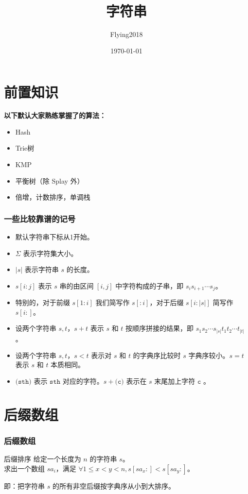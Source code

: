 \documentclass[UTF8]{beamer}
\begin{document}
\begin{CJK}{UTF8}{song}
\title[字符串]{字符串}

\author{Flying2018}
\date{\today}

\begin{frame}
	\titlepage
\end{frame}
\section{前置知识}
\begin{frame}
	\par
	\textbf{以下默认大家熟练掌握了的算法：}
	\begin{itemize}
		\item Hash
		\item Trie树
		\item KMP
		\item 平衡树（除 Splay 外）
		\item 倍增，计数排序，单调栈
	\end{itemize}
\end{frame}
\begin{frame}
	\frametitle{一些比较靠谱的记号}
	\begin{itemize}
		\item 默认字符串下标从1开始。
		\item $\Sigma$ 表示字符集大小。
		\item $|s|$ 表示字符串 $s$ 的长度。
		\item $s[i:j]$ 表示 $s$ 串的由区间 $[i,j]$ 中字符构成的子串，即 $s_is_{i+1}\cdots s_{j}$。
		\item 特别的，对于前缀 $s[1:i]$ 我们简写作 $s[:i]$，对于后缀 $s[i:|s|]$ 简写作 $s[i:]$。
		\item 设两个字符串 $s,t$，$s+t$ 表示 $s$ 和 $t$ 按顺序拼接的结果，即 $s_1s_2\cdots s_{|s|}t_1t_2\cdots t_{|t|}$。
		\item 设两个字符串 $s,t$，$s<t$ 表示对 $s$ 和 $t$ 的字典序比较时 $s$ 字典序较小。$s=t$ 表示 $s$ 和 $t$ 本质相同。
		\item $\texttt{(sth)}$ 表示 $\texttt{sth}$ 对应的字符。$s+\texttt{(c)}$ 表示在 $s$ 末尾加上字符 $\texttt{c}$ 。
	\end{itemize}
\end{frame}

\section{后缀数组}
\begin{frame}
	\frametitle{后缀数组}
	\par
	\begin{block}{后缀排序}
		给定一个长度为 $n$ 的字符串 $s$。\\
		求出一个数组 $sa_i$，满足 $\forall 1\leq x<y<n,s[sa_x:]<s[sa_y:]$。\\
	\end{block}
	\pause
	\par 即：把字符串 $s$ 的所有非空后缀按字典序从小到大排序。
\end{frame}

\end{CJK}
\end{document}
